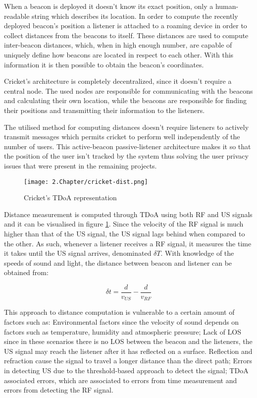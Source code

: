   
When a beacon is deployed it doesn't know its exact position, only a human-readable string which describes its location. In order to compute the recently deployed beacon's position a listener is attached to a roaming device in order to collect distances from the beacons to itself. These distances are used to compute inter-beacon distances, which, when in high enough number, are capable of uniquely define how beacons are located in respect to each other. With this information it is then possible to obtain the beacon's coordinates.  
  
  
Cricket's architecture is completely decentralized, since it doesn't require a central node. The used nodes are responsible for communicating with the beacons and calculating their own location, while the beacons are responsible for finding their positions and transmitting their information to the listeners.  
  
  
The utilised method for computing distances doesn't require listeners to actively transmit messages which permits cricket to perform well independently of the number of users. This active-beacon passive-listener architecture makes it so that the position of the user isn't tracked by the system thus solving the user privacy issues that were present in the remaining projects.  
  
  
\begin{figure}[H]  
\centering  
\texttt{[image: 2.Chapter/cricket-dist.png]}  
\caption[Cricket's \ac{TDoA} representation]{Cricket's \ac{TDoA} representation}  
\label{fig:cricket-tdoa}  
\end{figure}  
  
  
Distance measurement is computed through \ac{TDoA} using both \ac{RF} and \ac{US} signals and it can be visualised in figure \ref{fig:cricket-tdoa}. Since the velocity of the \ac{RF} signal is much higher than that of the \ac{US} signal, the \ac{US} signal lags behind when compared to the other. As such, whenever a listener receives a \ac{RF} signal, it measures the time it takes until the \ac{US} signal arrives, denominated $\delta{T}$. With knowledge of the speeds of sound and light, the distance between beacon and listener can be obtained from:  
  
  
\begin{equation}  
\delta t = \frac{d}{v_{US}} - \frac{d}{v_{RF}}  
\end{equation}  
  
  
This approach to distance computation is vulnerable to a certain amount of factors such as: Environmental factors since the velocity of sound depends on factors such as temperature, humidity and atmospheric pressure; Lack of \ac{LOS} since in these scenarios there is no \ac{LOS} between the beacon and the listeners, the \ac{US} signal may reach the listener after it has reflected on a surface. Reflection and refraction cause the signal to travel a longer distance than the direct path; Errors in detecting \ac{US} due to the threshold-based approach to detect the signal; \ac{TDoA} associated errors, which are associated to errors from time measurement and errors from detecting the \ac{RF} signal.  
  

